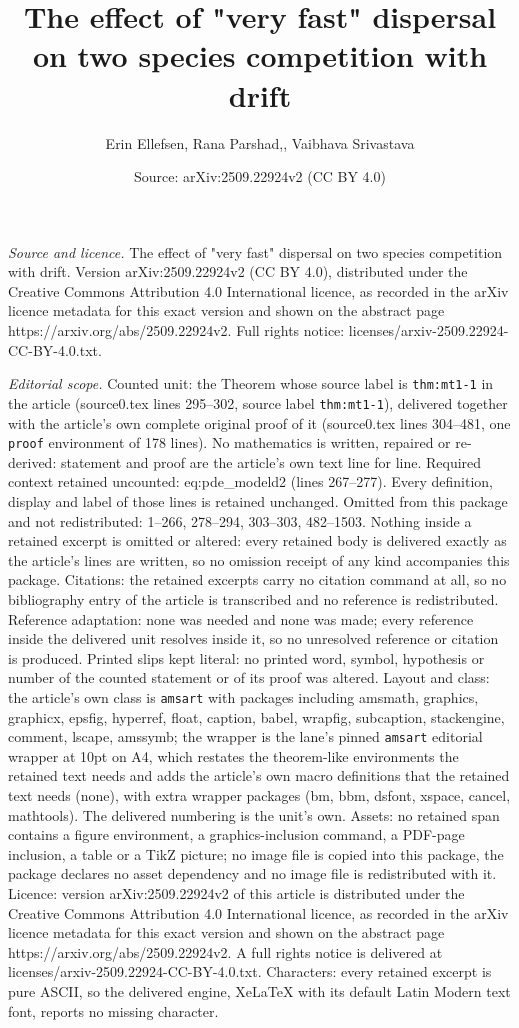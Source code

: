 \documentclass[10pt,a4paper]{amsart}
\title[The effect of "very fast" dispersal on two species competiti]{The effect of "very fast" dispersal on two species competition with drift}
\author{Erin Ellefsen, Rana Parshad,, Vaibhava Srivastava}
\date{Source: arXiv:2509.22924v2 (CC BY 4.0)}
\begin{document}
\maketitle

\noindent\emph{Source and licence.} The effect of "very fast" dispersal on two species competition with drift. Version arXiv:2509.22924v2 (CC BY 4.0), distributed under the Creative Commons Attribution 4.0 International licence, as recorded in the arXiv licence metadata for this exact version and shown on the abstract page https://arxiv.org/abs/2509.22924v2. Full rights notice: licenses/arxiv-2509.22924-CC-BY-4.0.txt.\par\smallskip

\noindent\textit{Editorial scope.} Counted unit: the Theorem whose source label is \texttt{thm:mt1-1} in the article (source0.tex lines 295--302, source label \texttt{thm:mt1-1}), delivered together with the article's own complete original proof of it (source0.tex lines 304--481, one \texttt{proof} environment of 178 lines). No mathematics is written, repaired or re-derived: statement and proof are the article's own text line for line. Required context retained uncounted: eq:pde\_modeld2 (lines 267--277). Every definition, display and label of those lines is retained unchanged. Omitted from this package and not redistributed: 1--266, 278--294, 303--303, 482--1503. Nothing inside a retained excerpt is omitted or altered: every retained body is delivered exactly as the article's lines are written, so no omission receipt of any kind accompanies this package. Citations: the retained excerpts carry no citation command at all, so no bibliography entry of the article is transcribed and no reference is redistributed. Reference adaptation: none was needed and none was made; every reference inside the delivered unit resolves inside it, so no unresolved reference or citation is produced. Printed slips kept literal: no printed word, symbol, hypothesis or number of the counted statement or of its proof was altered. Layout and class: the article's own class is \texttt{amsart} with packages including amsmath, graphics, graphicx, epsfig, hyperref, float, caption, babel, wrapfig, subcaption, stackengine, comment, lscape, amssymb; the wrapper is the lane's pinned \texttt{amsart} editorial wrapper at 10pt on A4, which restates the theorem-like environments the retained text needs and adds the article's own macro definitions that the retained text needs (none), with extra wrapper packages (bm, bbm, dsfont, xspace, cancel, mathtools). The delivered numbering is the unit's own. Assets: no retained span contains a figure environment, a graphics-inclusion command, a PDF-page inclusion, a table or a TikZ picture; no image file is copied into this package, the package declares no asset dependency and no image file is redistributed with it. Licence: version arXiv:2509.22924v2 of this article is distributed under the Creative Commons Attribution 4.0 International licence, as recorded in the arXiv licence metadata for this exact version and shown on the abstract page https://arxiv.org/abs/2509.22924v2. A full rights notice is delivered at licenses/arxiv-2509.22924-CC-BY-4.0.txt. Characters: every retained excerpt is pure ASCII, so the delivered engine, XeLaTeX with its default Latin Modern text font, reports no missing character.
\end{document}
